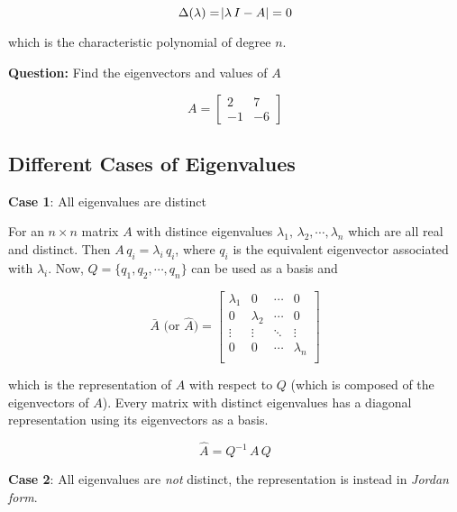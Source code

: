 \begin{equation} \label{eq:eign_char_poly}
  \Delta(\lambda) = \abs{\lambda \, I - A} = 0
\end{equation}

\noindent which is the characteristic polynomial of degree $n$.

\noindent \textbf{Question:} Find the eigenvectors and values of $A$

\begin{equation}
  A =
  \begin{bmatrix}
     2 & 7 \\
    -1 & -6
  \end{bmatrix}
\end{equation}

\subsection{Different Cases of Eigenvalues}

\noindent \textbf{Case 1}: All eigenvalues are distinct

For an $n \times n$ matrix $A$ with distince eigenvalues
$\lambda_1, \, \lambda_2, \cdots, \lambda_n$ which are all real and distinct.
Then $A \, q_i = \lambda_i \, q_i$, where $q_i$ is the equivalent eigenvector
associated with $\lambda_i$. Now, $Q = \{q_1, q_2, \cdots, q_n \}$ can be used
as a basis and

\begin{equation}
  \bar{A} \text{ (or } \hat{A} \text{)} =
  \begin{bmatrix}
    \lambda_1 & 0 & \cdots & 0 \\
    0 & \lambda_2 & \cdots & 0 \\
    \vdots & \vdots & \ddots & \vdots \\
    0 & 0 & \cdots & \lambda_n \\
  \end{bmatrix}
\end{equation}

\noindent which is the representation of $A$ with respect to $Q$ (which is
composed of the eigenvectors of $A$). Every matrix with distinct eigenvalues
has a diagonal representation using its eigenvectors as a basis.

\begin{equation} \label{eq:sim_trans_eigen}
  \hat{A} = Q^{-1} \, A \, Q
\end{equation}

\noindent \textbf{Case 2}: All eigenvalues are \textit{not} distinct, the
representation is instead in \textit{Jordan form}.


